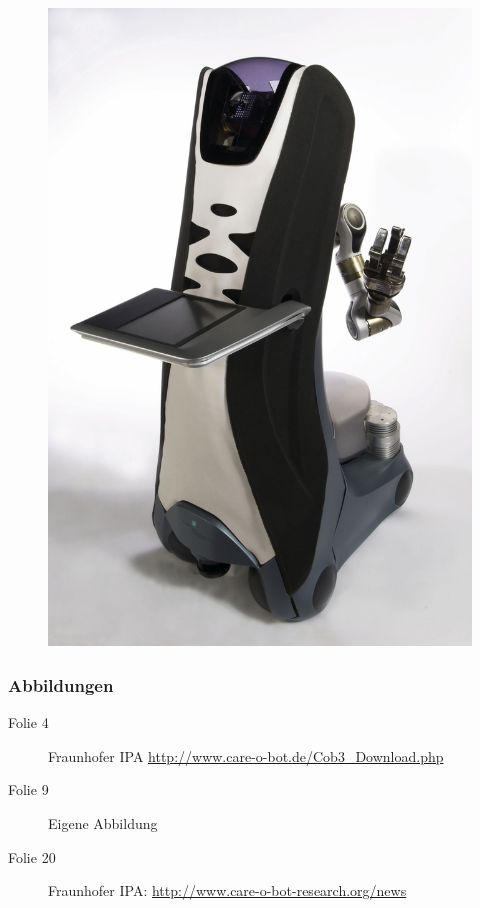 \begin{frame}[plain]
\begin{figure}
  \centering
  \includegraphics[height=\paperheight]{images/cob}
  \label{fig:cob}
\end{figure}
\end{frame}

\egroup
\begin{frame}
  \frametitle{Abbildungen}
  \begin{description}
    \item[Folie 4] Fraunhofer IPA \url{http://www.care-o-bot.de/Cob3_Download.php}
    \item[Folie 9] Eigene Abbildung
    \item[Folie 20] Fraunhofer IPA: \url{http://www.care-o-bot-research.org/news}
  \end{description}
\end{frame}

